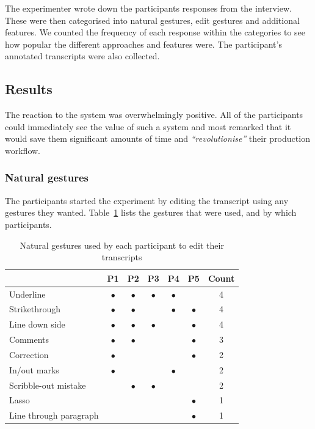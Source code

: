 The experimenter wrote down the participants responses from the interview. These were then categorised into natural
gestures, edit gestures and additional features. We counted the frequency of each response within the categories to
see how popular the different approaches and features were. The participant's annotated transcripts were also
collected.

\subsection{Results}
The reaction to the system was overwhelmingly positive. All of the participants could immediately see the value of such
a system and most remarked that it would save them significant amounts of time and \textit{``revolutionise''} their
production workflow.

\subsubsection{Natural gestures}

The participants started the experiment by editing the transcript using any gestures they wanted.
Table~\ref{tab:natural-gestures} lists the gestures that were used, and by which participants.

\begin{table}[ht]
  \centering
  \begin{tabular}{|l|c|c|c|c|c|c|}
    \hline
                            & P1        & P2        & P3        & P4        & P5        & Count \\
    \hline
    Underline               & $\bullet$ & $\bullet$ & $\bullet$ & $\bullet$ &           & 4 \\
    \hline
    Strikethrough           & $\bullet$ & $\bullet$ &           & $\bullet$ & $\bullet$ & 4 \\
    \hline
    Line down side          & $\bullet$ & $\bullet$ & $\bullet$ &           & $\bullet$ & 4 \\
    \hline
    Comments                & $\bullet$ & $\bullet$ &           &           & $\bullet$ & 3 \\
    \hline
    Correction              & $\bullet$ &           &           &           & $\bullet$ & 2 \\
    \hline
    In/out marks            & $\bullet$ &           &           & $\bullet$ &           & 2 \\
    \hline
    Scribble-out mistake    &           & $\bullet$ & $\bullet$ &           &           & 2 \\
    \hline
    Lasso                   &           &           &           &           & $\bullet$ & 1 \\
    \hline
    Line through paragraph  &           &           &           &           & $\bullet$ & 1 \\
    \hline
  \end{tabular}
  \caption{Natural gestures used by each participant to edit their transcripts}
  \label{tab:natural-gestures}
\end{table}

